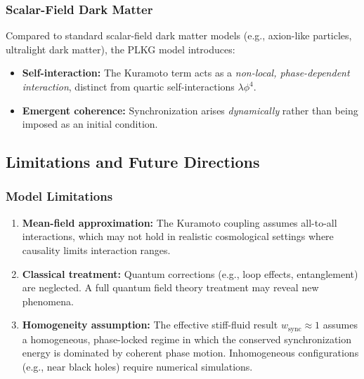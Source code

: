 \subsubsection{Scalar-Field Dark Matter}
Compared to standard scalar-field dark matter models (e.g., axion-like particles, ultralight dark matter), the PLKG model introduces:
\begin{itemize}
    \item \textbf{Self-interaction:} The Kuramoto term acts as a \emph{non-local, phase-dependent interaction}, distinct from quartic self-interactions $\lambda \phi^4$.
    \item \textbf{Emergent coherence:} Synchronization arises \emph{dynamically} rather than being imposed as an initial condition.
\end{itemize}

\subsection{Limitations and Future Directions}
\label{subsec:limitations}

\subsubsection{Model Limitations}
\begin{enumerate}
    \item \textbf{Mean-field approximation:} The Kuramoto coupling assumes all-to-all interactions, which may not hold in realistic cosmological settings where causality limits interaction ranges.
    \item \textbf{Classical treatment:} Quantum corrections (e.g., loop effects, entanglement) are neglected. A full quantum field theory treatment may reveal new phenomena.
    \item \textbf{Homogeneity assumption:} The effective stiff-fluid result $w_{\text{sync}} \approx 1$ assumes a homogeneous, phase-locked regime in which the conserved synchronization energy is dominated by coherent phase motion. Inhomogeneous configurations (e.g., near black holes) require numerical simulations.
\end{enumerate}

